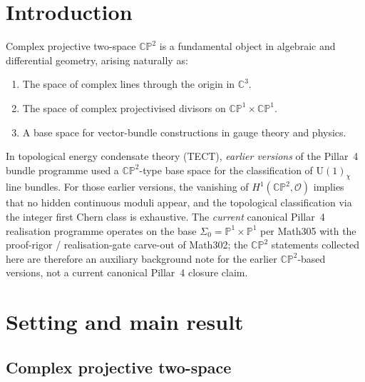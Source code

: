 \maketitle

\section{Introduction}
Complex projective two-space $\mathbb{CP}^2$ is a fundamental object in
algebraic and differential geometry, arising naturally as:
\begin{enumerate}
\item The space of complex lines through the origin in $\mathbb{C}^3$.
\item The space of complex projectivised divisors on $\mathbb{CP}^1 \times \mathbb{CP}^1$.
\item A base space for vector-bundle constructions in gauge theory and physics.
\end{enumerate}

In topological energy condensate theory (TECT), \emph{earlier
versions} of the Pillar~4 bundle programme used a
$\mathbb{CP}^2$-type base space for the classification of
$\mathrm{U}(1)_\chi$ line bundles. For those earlier versions, the
vanishing of $H^1(\mathbb{CP}^2, \mathcal{O})$ implies that no
hidden continuous moduli appear, and the topological classification
via the integer first Chern class is exhaustive. The \emph{current}
canonical Pillar~4 realisation programme operates on the base
$\Sigma_0 = \mathbb{P}^1\times\mathbb{P}^1$ per Math305 with the
proof-rigor / realisation-gate carve-out of Math302; the
$\mathbb{CP}^2$ statements collected here are therefore an
auxiliary background note for the earlier $\mathbb{CP}^2$-based
versions, not a current canonical Pillar~4 closure claim.

\section{Setting and main result}
\subsection{Complex projective two-space}

